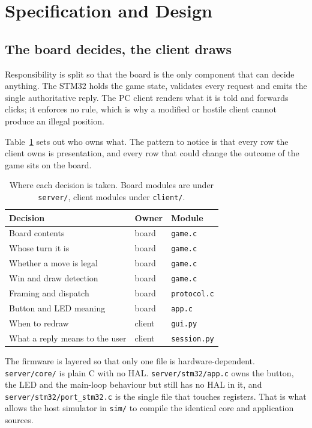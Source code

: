 \section{Specification and Design}
\label{sec:design}

\subsection{The board decides, the client draws}
Responsibility is split so that the board is the only component that can decide
anything. The STM32 holds the game state, validates every request and emits the
single authoritative reply. The PC client renders what it is told and forwards
clicks; it enforces no rule, which is why a modified or hostile client cannot
produce an illegal position.

Table~\ref{tab:split} sets out who owns what. The pattern to notice is that
every row the client owns is presentation, and every row that could change the
outcome of the game sits on the board.

\begin{table}[htbp]
\caption{Where each decision is taken. Board modules are under \texttt{server/}, client modules under \texttt{client/}.}
\label{tab:split}
\centering
\footnotesize
\begin{tabular}{p{3.7cm}p{1.2cm}p{1.9cm}}
\hline
\textbf{Decision} & \textbf{Owner} & \textbf{Module} \\
\hline
Board contents & board & \texttt{game.c} \\
Whose turn it is & board & \texttt{game.c} \\
Whether a move is legal & board & \texttt{game.c} \\
Win and draw detection & board & \texttt{game.c} \\
Framing and dispatch & board & \texttt{protocol.c} \\
Button and LED meaning & board & \texttt{app.c} \\
When to redraw & client & \texttt{gui.py} \\
What a reply means to the user & client & \texttt{session.py} \\
\hline
\end{tabular}
\end{table}

The firmware is layered so that only one file is hardware-dependent.
\texttt{server/core/} is plain C with no HAL. \texttt{server/stm32/app.c} owns
the button, the LED and the main-loop behaviour but still has no HAL in it, and
\texttt{server/stm32/port\_stm32.c} is the single file that touches registers.
That is what allows the host simulator in \texttt{sim/} to compile the identical
core and application sources.

